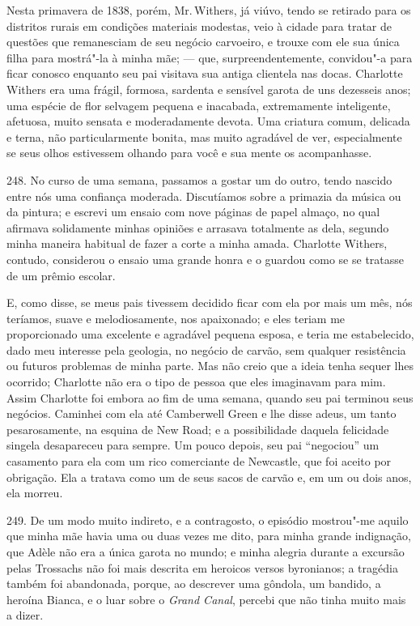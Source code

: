 Nesta primavera de 1838, porém, Mr.\,Withers, já viúvo, tendo se retirado
para os distritos rurais em condições materiais modestas, veio à cidade
para tratar de questões que remanesciam de seu negócio carvoeiro, e
trouxe com ele sua única filha para mostrá"-la à minha mãe; --- que,
surpreendentemente, convidou"-a para ficar conosco enquanto seu pai
visitava sua antiga clientela nas docas. Charlotte Withers era uma
frágil, formosa, sardenta e sensível garota de uns dezesseis anos; uma
espécie de flor selvagem pequena e inacabada, extremamente inteligente,
afetuosa, muito sensata e moderadamente devota. Uma criatura comum,
delicada e terna, não particularmente bonita, mas muito agradável de
ver, especialmente se seus olhos estivessem olhando para você e sua
mente os acompanhasse.

248. No curso de uma semana, passamos a gostar um do outro, tendo
nascido entre nós uma confiança moderada. Discutíamos sobre a primazia
da música ou da pintura; e escrevi um ensaio com nove páginas de papel
almaço, no qual afirmava solidamente minhas opiniões e arrasava
totalmente as dela, segundo minha maneira habitual de fazer a corte a
minha amada. Charlotte Withers, contudo, considerou o ensaio uma grande
honra e o guardou como se se tratasse de um prêmio escolar.

E, como disse, se meus pais tivessem decidido ficar com ela por mais um
mês, nós teríamos, suave e melodiosamente, nos apaixonado; e eles teriam
me proporcionado uma excelente e agradável pequena esposa, e teria me
estabelecido, dado meu interesse pela geologia, no negócio de carvão,
sem qualquer resistência ou futuros problemas de minha parte. Mas não
creio que a ideia tenha sequer lhes ocorrido; Charlotte não era o tipo
de pessoa que eles imaginavam para mim. Assim Charlotte foi embora ao
fim de uma semana, quando seu pai terminou seus negócios. Caminhei com
ela até Camberwell Green e lhe disse adeus, um tanto pesarosamente, na
esquina de New Road; e a possibilidade daquela felicidade singela
desapareceu para sempre. Um pouco depois, seu pai ``negociou'' um
casamento para ela com um rico comerciante de Newcastle, que foi aceito
por obrigação. Ela a tratava como um de seus sacos de carvão e, em um ou
dois anos, ela morreu.

249. De um modo muito indireto, e a contragosto, o episódio mostrou"-me
aquilo que minha mãe havia uma ou duas vezes me dito, para minha grande
indignação, que Adèle não era a única garota no mundo; e minha alegria
durante a excursão pelas Trossachs não foi mais descrita em heroicos
versos byronianos; a tragédia também foi abandonada, porque, ao
descrever uma gôndola, um bandido, a heroína Bianca, e o luar sobre o
\emph{Grand Canal}, percebi que não tinha muito mais a dizer.

